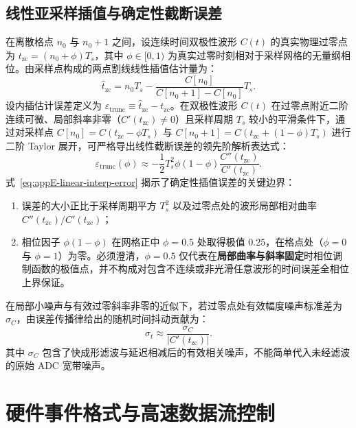\subsection{线性亚采样插值与确定性截断误差}

在离散格点 $n_0$ 与 $n_0 + 1$ 之间，设连续时间双极性波形 $C(t)$ 的真实物理过零点为 $t_{\mathrm{zc}} = (n_0 + \phi) T_s$，其中 $\phi \in [0, 1)$ 为真实过零时刻相对于采样网格的无量纲相位。由采样点构成的两点割线线性插值估计量为：
\begin{equation}\label{eq:appE-cfd-subsample}
\widehat{t}_{\mathrm{zc}} = n_0 T_s - \frac{C[n_0]}{C[n_0 + 1] - C[n_0]} T_s.
\end{equation}
设内插估计误差定义为 $\varepsilon_{\mathrm{trunc}} \equiv \widehat{t}_{\mathrm{zc}} - t_{\mathrm{zc}}$。在双极性波形 $C(t)$ 在过零点附近二阶连续可微、局部斜率非零（$C'(t_{\mathrm{zc}}) \ne 0$）且采样周期 $T_s$ 较小的平滑条件下，通过对采样点 $C[n_0] = C(t_{\mathrm{zc}} - \phi T_s)$ 与 $C[n_0+1] = C(t_{\mathrm{zc}} + (1-\phi) T_s)$ 进行二阶 Taylor 展开，可严格导出线性截断误差的领先阶解析表达式：
\begin{equation}\label{eq:appE-linear-interp-error}
\varepsilon_{\mathrm{trunc}}(\phi) \approx -\frac{1}{2} T_s^2 \phi (1 - \phi) \frac{C''(t_{\mathrm{zc}})}{C'(t_{\mathrm{zc}})}.
\end{equation}
式~\eqref{eq:appE-linear-interp-error} 揭示了确定性插值误差的关键边界：
\begin{enumerate}
\item 误差的大小正比于采样周期平方 $T_s^2$ 以及过零点处的波形局部相对曲率 $C''(t_{\mathrm{zc}}) / C'(t_{\mathrm{zc}})$；
\item 相位因子 $\phi(1 - \phi)$ 在网格正中 $\phi = 0.5$ 处取得极值 $0.25$，在格点处（$\phi = 0$ 与 $\phi = 1$）为零。必须澄清，$\phi = 0.5$ 仅代表在\textbf{局部曲率与斜率固定}时相位调制函数的极值点，并不构成对包含不连续或非光滑任意波形的时间误差全相位上界保证。
\end{enumerate}

在局部小噪声与有效过零斜率非零的近似下，若过零点处有效幅度噪声标准差为 $\sigma_C$，由误差传播律给出的随机时间抖动贡献为：
\begin{equation}\label{eq:appE-timing-jitter}
\sigma_t \approx \frac{\sigma_C}{|C'(t_{\mathrm{zc}})|}.
\end{equation}
其中 $\sigma_C$ 包含了快成形滤波与延迟相减后的有效相关噪声，不能简单代入未经滤波的原始 ADC 宽带噪声。

\section{硬件事件格式与高速数据流控制}\label{sec:appE-packet-format}

